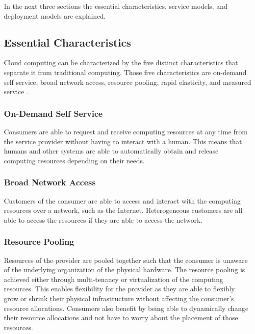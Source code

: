 \documentclass[12pt]{article}
\begin{document}
In the next three sections the essential characteristics, service models, and deployment models are explained.



\subsection{Essential Characteristics} \label{sub:essential-characteristics}

Cloud computing can be characterized by the five distinct characteristics that separate it from traditional computing. Those five characteristics are on-demand self service, broad network access, resource pooling, rapid elasticity, and measured service \cite{alam2015comprehensive, dillon2010cloud}.

\subsubsection{On-Demand Self Service} \label{ssub:on-demand}

Consumers are able to request and receive computing resources at any time from the service provider without having to interact with a human. This means that humans and other systems are able to automatically obtain and release computing resources depending on their needs.


\subsubsection{Broad Network Access} \label{ssub:net-access}

Customers of the consumer are able to access and interact with the computing resources over a network, such as the Internet. Heterogeneous customers are all able to access the resources if they are able to access the network.


\subsubsection{Resource Pooling} \label{ssub:resource-pooling}

Resources of the provider are pooled together such that the consumer is unaware of the underlying organization of the physical hardware. The resource pooling is achieved either through multi-tenancy or virtualization of the computing resources. This enables flexibility for the provider as they are able to flexibly grow or shrink their physical infrastructure without affecting the consumer's resource allocations. Consumers also benefit by being able to dynamically change their resource allocations and not have to worry about the placement of those resources.
\end{document}

